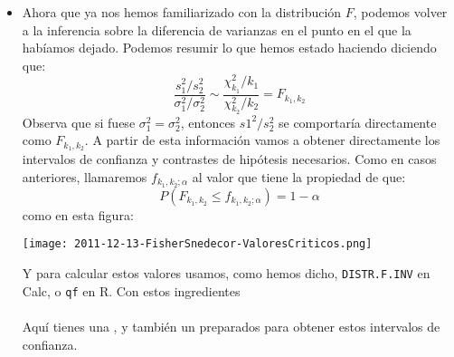 \begin{itemize}
    \item Ahora que ya nos hemos familiarizado con la distribución $F$, podemos volver a la inferencia sobre la diferencia de varianzas en el punto en el que la habíamos dejado. Podemos resumir lo que hemos estado haciendo diciendo que:
        \[\dfrac{s_1^2/s_2^2}{\sigma_1^2/\sigma_2^2}\sim\dfrac{\chi^2_{k_1}/k_1}{\chi^2_{k_2}/k_2}=F_{k_1,k_2}\]
        Observa que si fuese $\sigma_1^2=\sigma_2^2$, entonces $s1^2/s_2^2$ se comportaría directamente como $F_{k_1,k_2}$. A partir de esta información vamos a obtener directamente los intervalos de confianza y contrastes de hipótesis necesarios. Como en casos anteriores, {\sf llamaremos $f_{k_1,k_2;\alpha}$ al valor que tiene la propiedad de que:}
        \[P(F_{k_1,k_2}\leq f_{k_1,k_2;\alpha})=1-\alpha\]
        como en esta figura:
        \begin{center}
        \texttt{[image: 2011-12-13-FisherSnedecor-ValoresCriticos.png]}
        \end{center}
        Y para calcular estos valores usamos, como hemos dicho, {\tt DISTR.F.INV} en Calc, o {\tt qf} en R. Con estos ingredientes
        \\[3mm]
       \\[3mm]
        Aquí tienes una , y también un  preparados para obtener estos intervalos de confianza.


\end{itemize}
